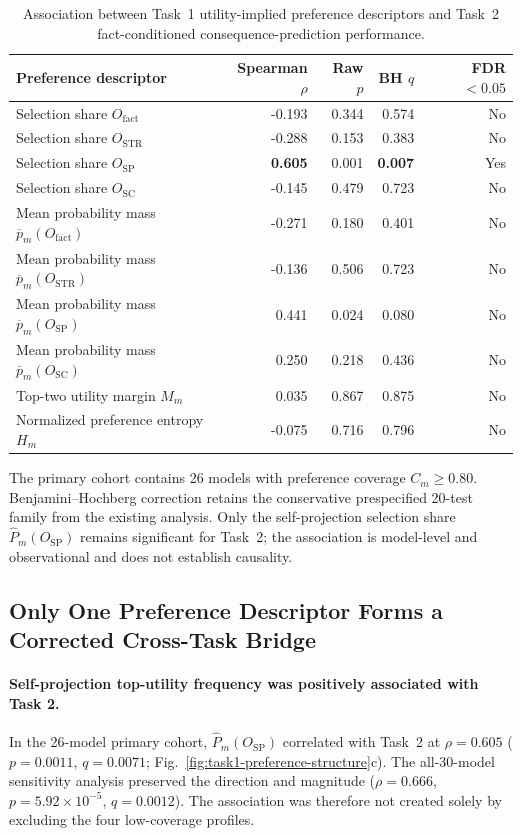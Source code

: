 \documentclass[pdflatex,sn-mathphys-num]{sn-jnl}%
\theoremstyle{thmstyleone}%
\theoremstyle{thmstyletwo}%
\theoremstyle{thmstylethree}%
\begin{document}
\begin{table}
\centering
\caption{Association between Task~1 utility-implied preference descriptors and Task~2 fact-conditioned consequence-prediction performance.}
\label{tab:preference_task2_correlations}
\small
\setlength{\tabcolsep}{8.0pt}
\begin{tabular}{lrrrr}
\toprule
Preference descriptor & Spearman $\rho$ & Raw $p$ & BH $q$ & FDR $<0.05$ \\
\midrule
Selection share $O_{\mathrm{fact}}$ & -0.193 & 0.344 & 0.574 & No \\
Selection share $O_{\mathrm{STR}}$ & -0.288 & 0.153 & 0.383 & No \\
Selection share $O_{\mathrm{SP}}$ & \textbf{0.605} & 0.001 & \textbf{0.007} & Yes \\
Selection share $O_{\mathrm{SC}}$ & -0.145 & 0.479 & 0.723 & No \\
Mean probability mass $\overline p_m(O_{\mathrm{fact}})$ & -0.271 & 0.180 & 0.401 & No \\
Mean probability mass $\overline p_m(O_{\mathrm{STR}})$ & -0.136 & 0.506 & 0.723 & No \\
Mean probability mass $\overline p_m(O_{\mathrm{SP}})$ & 0.441 & 0.024 & 0.080 & No \\
Mean probability mass $\overline p_m(O_{\mathrm{SC}})$ & 0.250 & 0.218 & 0.436 & No \\
Top-two utility margin $M_m$ & 0.035 & 0.867 & 0.875 & No \\
Normalized preference entropy $H_m$ & -0.075 & 0.716 & 0.796 & No \\
\bottomrule
\end{tabular}
\footnotesize
The primary cohort contains 26 models with preference coverage $C_m\geq 0.80$. Benjamini--Hochberg correction retains the conservative prespecified 20-test family from the existing analysis. Only the self-projection selection share $\widehat P_m(O_{\mathrm{SP}})$ remains significant for Task~2; the association is model-level and observational and does not establish causality.
\end{table}

\FloatBarrier

\subsection{Only One Preference Descriptor Forms a Corrected Cross-Task Bridge}

\paragraph{Self-projection top-utility frequency was positively associated with Task 2.}
In the 26-model primary cohort, $\widehat P_m(O_{\mathrm{SP}})$ correlated with Task~2 at $\rho=0.605$ ($p=0.0011$, $q=0.0071$; Fig.~\ref{fig:task1-preference-structure}c). The all-30-model sensitivity analysis preserved the direction and magnitude ($\rho=0.666$, $p=5.92\times10^{-5}$, $q=0.0012$). The association was therefore not created solely by excluding the four low-coverage profiles.
\end{document}
